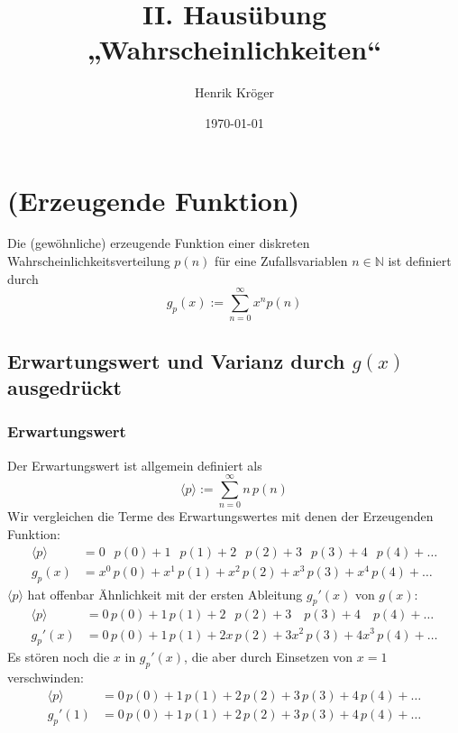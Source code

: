 \documentclass[a4paper]{article}
\title{II. Hausübung „Wahrscheinlichkeiten“}
\author{Henrik Kröger}
\date{\today}
\begin{document}
\maketitle

\section{(Erzeugende Funktion)}
Die (gewöhnliche) erzeugende Funktion
einer diskreten Wahrscheinlichkeitsverteilung $p(n)$
für eine Zufallsvariablen $n\in\mathbb{N}$ ist definiert durch
\begin{equation}
    g_p(x) := \sum_{n=0}^{\infty} x^n p(n) \label{eq:erzeugende}
\end{equation}

\subsection{Erwartungswert und Varianz durch $g(x)$ ausgedrückt}
\subsubsection{Erwartungswert}
Der Erwartungswert ist allgemein definiert als
\begin{equation}
    \langle p \rangle := \sum_{n=0}^{\infty} n \, p(n)
\end{equation}
Wir vergleichen die Terme des Erwartungswertes mit denen der Erzeugenden Funktion:
\begin{align*}
    \langle p \rangle &= 0\;\;\,p(0)   + 1\;\;\,p(1) + 2\;\;\,p(2) + 3\;\;\,p(3) + 4\;\;\,p(4) + \ldots \\
    g_p(x)            &= x^0\,p(0) + x^1\,p(1) + x^2\,p(2) + x^3\,p(3) + x^4\,p(4) + \ldots
\end{align*}
$\langle p \rangle$ hat offenbar Ähnlichkeit mit der ersten Ableitung $g_p'(x)$ von $g(x)$:
\begin{align*}
    \langle p \rangle &= 0\,p(0) + 1\,p(1) + 2\;\;\,p(2) + 3\;\;\;\,p(3) + 4\;\;\;\,p(4) + \ldots \\
    g_p'(x)           &= 0\,p(0) + 1\,p(1) + 2x\,p(2) +    3x^2\,p(3)    + 4x^3\,p(4) + \ldots
\end{align*}
Es stören noch die $x$ in $g_p'(x)$, die aber durch Einsetzen von $x=1$ verschwinden:
\begin{align*}
    \langle p \rangle &= 0\,p(0) + 1\,p(1) + 2\,p(2) + 3\,p(3) + 4\,p(4) + \ldots \\
    g_p'(1)           &= 0\,p(0) + 1\,p(1) + 2\,p(2) + 3\,p(3) + 4\,p(4) + \ldots \\
\end{align*}
\end{document}
